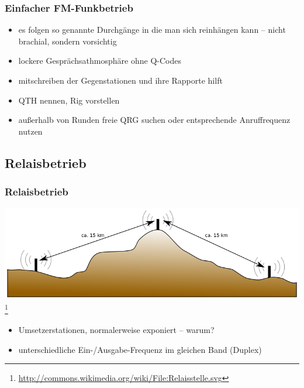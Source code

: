 \begin{frame}
    \frametitle{Einfacher FM-Funkbetrieb}

    \begin{itemize}[<+->]
        \item es folgen so genannte Durchgänge in die man sich reinhängen kann --
              nicht brachial, sondern vorsichtig
        \item lockere Gesprächsathmosphäre ohne Q-Codes
        \item mitschreiben der Gegenstationen und ihre Rapporte hilft
        \item QTH nennen, Rig vorstellen
        \item außerhalb von Runden freie QRG suchen oder entsprechende
              Anruffrequenz nutzen
    \end{itemize}

\end{frame}

\subsection{Relaisbetrieb}

\begin{frame}
    \frametitle{Relaisbetrieb}

    \begin{center}
        \includegraphics[width=1\textwidth,height=.6\textheight,keepaspectratio]{bv11/Relaisstelle.png}
        \footnote{\tiny \url{http://commons.wikimedia.org/wiki/File:Relaisstelle.svg}}
    \end{center}

    \begin{itemize}
        \item Umsetzerstationen, normalerweise exponiert -- warum?
        \item unterschiedliche Ein-/Ausgabe-Frequenz im gleichen Band (Duplex)
    \end{itemize}

\end{frame}

